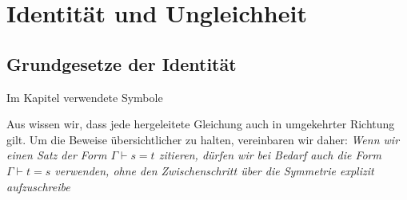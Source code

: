\documentclass[main.tex]{subfiles}
\begin{document}
\begin{tabproofsplit}

\closeproofpart

  \setcounter{proofstepnr}{9}%

\closeproofpart

  \setcounter{proofstepnr}{11}%

\closeproofpart
\end{tabproofsplit}

\chapter{Identität und Ungleichheit}

\section{Grundgesetze der Identität}
\begin{DeltaContext}{Im Kapitel verwendete Symbole}
\end{DeltaContext}

\begin{tabproof}
\end{tabproof}
\begin{remark}
  Aus  wissen wir, dass jede
  hergeleitete Gleichung auch in umgekehrter Richtung gilt.
  Um die Beweise übersichtlicher zu halten, vereinbaren wir daher:
  \emph{Wenn wir einen Satz der Form \(\Gamma \vdash s = t\) zitieren,
  dürfen wir bei Bedarf auch die Form \(\Gamma \vdash t = s\) verwenden,
  ohne den Zwischenschritt über die Symmetrie explizit aufzuschreibe}
\end{remark}
\end{document}
